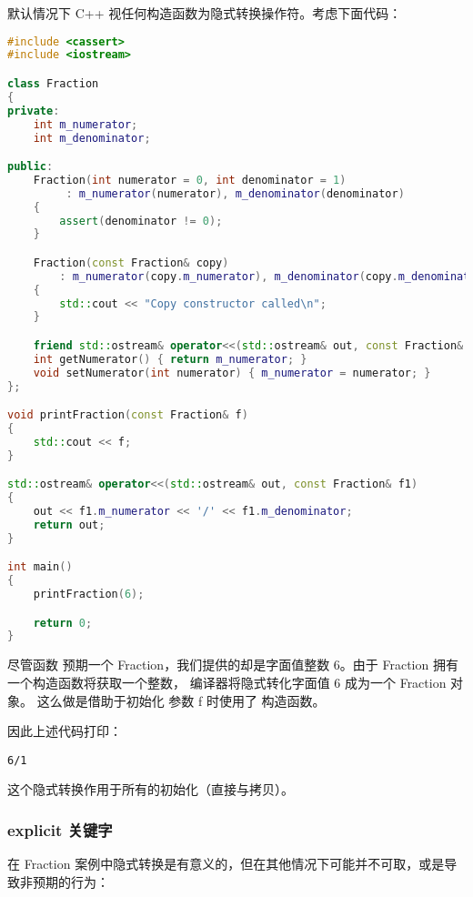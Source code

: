 \documentclass[../../LearnCpp.tex]{subfiles}
\begin{document}

默认情况下 C++ 视任何构造函数为隐式转换操作符。考虑下面代码：

\begin{lstlisting}[language=C++]
#include <cassert>
#include <iostream>

class Fraction
{
private:
	int m_numerator;
	int m_denominator;

public:
	Fraction(int numerator = 0, int denominator = 1)
		 : m_numerator(numerator), m_denominator(denominator)
	{
		assert(denominator != 0);
	}

	Fraction(const Fraction& copy)
		: m_numerator(copy.m_numerator), m_denominator(copy.m_denominator)
	{
		std::cout << "Copy constructor called\n";
	}

	friend std::ostream& operator<<(std::ostream& out, const Fraction& f1);
	int getNumerator() { return m_numerator; }
	void setNumerator(int numerator) { m_numerator = numerator; }
};

void printFraction(const Fraction& f)
{
	std::cout << f;
}

std::ostream& operator<<(std::ostream& out, const Fraction& f1)
{
	out << f1.m_numerator << '/' << f1.m_denominator;
	return out;
}

int main()
{
	printFraction(6);

	return 0;
}
\end{lstlisting}

尽管函数  预期一个 Fraction，我们提供的却是字面值整数 6。由于 Fraction 拥有一个构造函数将获取一个整数，
编译器将隐式转化字面值 6 成为一个 Fraction 对象。
这么做是借助于初始化  参数 f 时使用了  构造函数。

因此上述代码打印：

\begin{lstlisting}
6/1
\end{lstlisting}

这个隐式转换作用于所有的初始化（直接与拷贝）。

\subsubsection*{explicit 关键字}

在 Fraction 案例中隐式转换是有意义的，但在其他情况下可能并不可取，或是导致非预期的行为：
\end{document}
